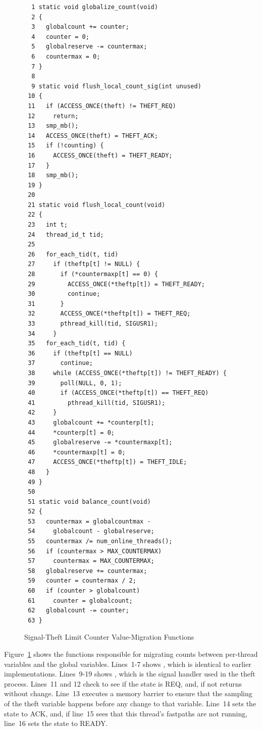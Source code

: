\begin{figure}[tbp]
{ \scriptsize
\begin{verbatim}
  1 static void globalize_count(void)
  2 {
  3   globalcount += counter;
  4   counter = 0;
  5   globalreserve -= countermax;
  6   countermax = 0;
  7 }
  8 
  9 static void flush_local_count_sig(int unused)
 10 {
 11   if (ACCESS_ONCE(theft) != THEFT_REQ)
 12     return;
 13   smp_mb();
 14   ACCESS_ONCE(theft) = THEFT_ACK;
 15   if (!counting) {
 16     ACCESS_ONCE(theft) = THEFT_READY;
 17   }
 18   smp_mb();
 19 }
 20 
 21 static void flush_local_count(void)
 22 {
 23   int t;
 24   thread_id_t tid;
 25 
 26   for_each_tid(t, tid)
 27     if (theftp[t] != NULL) {
 28       if (*countermaxp[t] == 0) {
 29         ACCESS_ONCE(*theftp[t]) = THEFT_READY;
 30         continue;
 31       }
 32       ACCESS_ONCE(*theftp[t]) = THEFT_REQ;
 33       pthread_kill(tid, SIGUSR1);
 34     }
 35   for_each_tid(t, tid) {
 36     if (theftp[t] == NULL)
 37       continue;
 38     while (ACCESS_ONCE(*theftp[t]) != THEFT_READY) {
 39       poll(NULL, 0, 1);
 40       if (ACCESS_ONCE(*theftp[t]) == THEFT_REQ)
 41         pthread_kill(tid, SIGUSR1);
 42     }
 43     globalcount += *counterp[t];
 44     *counterp[t] = 0;
 45     globalreserve -= *countermaxp[t];
 46     *countermaxp[t] = 0;
 47     ACCESS_ONCE(*theftp[t]) = THEFT_IDLE;
 48   }
 49 }
 50 
 51 static void balance_count(void)
 52 {
 53   countermax = globalcountmax -
 54     globalcount - globalreserve;
 55   countermax /= num_online_threads();
 56   if (countermax > MAX_COUNTERMAX)
 57     countermax = MAX_COUNTERMAX;
 58   globalreserve += countermax;
 59   counter = countermax / 2;
 60   if (counter > globalcount)
 61     counter = globalcount;
 62   globalcount -= counter;
 63 }
\end{verbatim}
}
\caption{Signal-Theft Limit Counter Value-Migration Functions}
\label{fig:count:Signal-Theft Limit Counter Value-Migration Functions}
\end{figure}

Figure~\ref{fig:count:Signal-Theft Limit Counter Value-Migration Functions}
shows the functions responsible for migrating counts between per-thread
variables and the global variables.
Lines~1-7 shows , which is identical to earlier
implementations.
Lines~9-19 shows , which is the signal
handler used in the theft process.
Lines~11 and 12 check to see if the  state is REQ, and, if not
returns without change.
Line~13 executes a memory barrier to ensure that the sampling of the
theft variable happens before any change to that variable.
Line~14 sets the  state to ACK, and, if line~15 sees that
this thread's fastpaths are not running, line~16 sets the 
state to READY.

